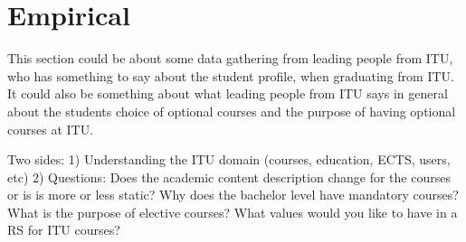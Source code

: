 \section{Empirical}
This section could be about some data gathering from leading people from ITU, who has something to say about the student profile, when graduating from ITU. It could also be something about what leading people from ITU says in general about the students choice of optional courses and the purpose of having optional courses at ITU. 

Two sides:
1) Understanding the ITU domain (courses, education, ECTS, users, etc)
2) Questions:
Does the academic content description change for the courses or is is more or less static?
Why does the bachelor level have mandatory courses?
What is the purpose of elective courses?
What values would you like to have in a RS for ITU courses?

